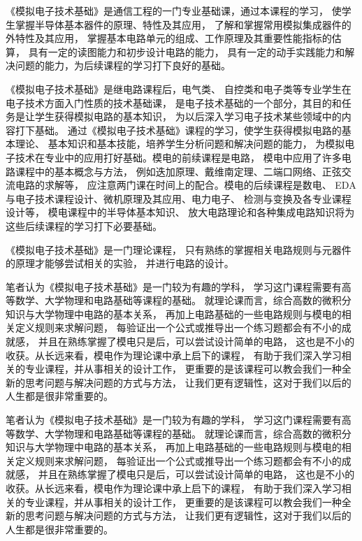 \documentclass[10pt, conference, compsocconf, a4paper]{IEEEtran}
\begin{document}
《模拟电子技术基础》是通信工程的一门专业基础课，通过本课程的学习，
使学生掌握半导体基本器件的原理、特性及其应用，
了解和掌握常用模拟集成器件的外特性及其应用，
掌握基本电路单元的组成、工作原理及其重要性能指标的估算，
具有一定的读图能力和初步设计电路的能力，
具有一定的动手实践能力和解决问题的能力，为后续课程的学习打下良好的基础。\cite{li2009}
\par

《模拟电子技术基础》是继电路课程后，电气类、
自控类和电子类等专业学生在电子技术方面入门性质的技术基础课，
是电子技术基础的一个部分，其目的和任务是让学生获得模拟电路的基本知识，
为以后深入学习电子技术某些领域中的内容打下基础。
通过《模拟电子技术基础》课程的学习，使学生获得模拟电路的基本理论、
基本知识和基本技能，培养学生分析问题和解决问题的能力，
为模拟电子技术在专业中的应用打好基础。模电的前续课程是电路，
模电中应用了许多电路课程中的基本概念与方法，
例如迭加原理、戴维南定理、二端口网络、正弦交流电路的求解等，
应注意两门课在时间上的配合。模电的后续课程是数电、
EDA与电子技术课程设计、微机原理及其应用、电力电子、
检测与变换及各专业课程设计等，
模电课程中的半导体基本知识、
放大电路理论和各种集成电路知识将为这些后续课程的学习打下必要基础。\cite{huang2010}
\par

《模拟电子技术基础》是一门理论课程，
只有熟练的掌握相关电路规则与元器件的原理才能够尝试相关的实验，
并进行电路的设计。\par

笔者认为《模拟电子技术基础》是一门较为有趣的学科，
学习这门课程需要有高等数学、大学物理和电路基础等课程的基础。
就理论课而言，综合高数的微积分知识与大学物理中电路的基本关系，
再加上电路基础的一些电路规则与模电的相关定义规则来求解问题，
每验证出一个公式或推导出一个练习题都会有不小的成就感，
并且在熟练掌握了模电只是后，可以尝试设计简单的电路，
这也是不小的收获。从长远来看，模电作为理论课中承上启下的课程，
有助于我们深入学习相关的专业课程，并从事相关的设计工作，
更重要的是该课程可以教会我们一种全新的思考问题与解决问题的方式与方法，
让我们更有逻辑性，这对于我们以后的人生都是很非常重要的。\cite{zhou2013}
\par


笔者认为《模拟电子技术基础》是一门较为有趣的学科，
学习这门课程需要有高等数学、大学物理和电路基础等课程的基础。
就理论课而言，综合高数的微积分知识与大学物理中电路的基本关系，
再加上电路基础的一些电路规则与模电的相关定义规则来求解问题，
每验证出一个公式或推导出一个练习题都会有不小的成就感，
并且在熟练掌握了模电只是后，可以尝试设计简单的电路，
这也是不小的收获。从长远来看，模电作为理论课中承上启下的课程，
有助于我们深入学习相关的专业课程，并从事相关的设计工作，
更重要的是该课程可以教会我们一种全新的思考问题与解决问题的方式与方法，
让我们更有逻辑性，这对于我们以后的人生都是很非常重要的。\cite{hu2013}
\par
\end{document}
